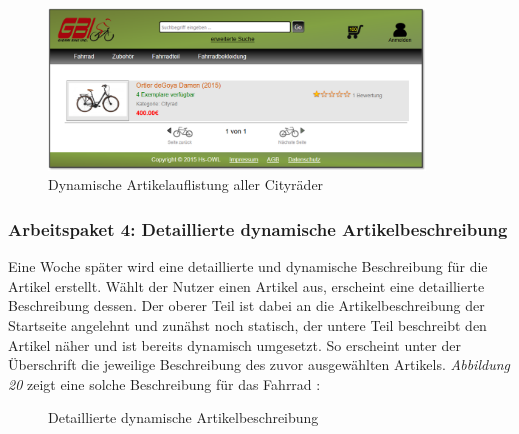 \begin{figure}[H]
\begin{center}
\includegraphics[width=10cm]{Bilder/Abbildung10-DynamischeArtikelauflistungAllerCitybikes.png}
\end{center}
\caption{Dynamische Artikelauflistung aller Cityräder}
\label{Abbildung10-Dynamische Artikelauflistung aller Cityräder}
\end{figure}


\subsubsection{Arbeitspaket 4: Detaillierte dynamische Artikelbeschreibung}

Eine Woche später wird eine detaillierte und dynamische Beschreibung für die Artikel erstellt. Wählt der Nutzer einen Artikel aus, erscheint eine detaillierte Beschreibung dessen. Der oberer Teil ist dabei an die Artikelbeschreibung der Startseite angelehnt und zunähst noch statisch, der untere Teil beschreibt den Artikel näher und ist bereits dynamisch umgesetzt. So erscheint unter der Überschrift \grqq{} die jeweilige Beschreibung des zuvor ausgewählten Artikels. \textit{Abbildung 20} zeigt eine solche Beschreibung für das Fahrrad \grqq{}:

\begin{figure}[H]
\begin{center}
\end{center}
\caption{Detaillierte dynamische Artikelbeschreibung}
\label{Abbildung11-Detaillierte dynamische Artikelbeschreibung}
\end{figure}

